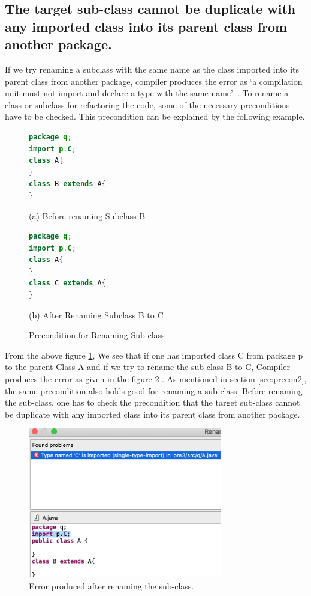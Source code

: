 \subsection{The target sub-class cannot be duplicate with any imported class into its parent class from another package.}

If we try renaming a subclass with the same name as the class imported into its parent class from another package, compiler produces the error as `a compilation unit must not import and declare a type with the same name'~\cite{EclipseWebPage}. 
To rename a class or subclass for refactoring the code, some of the necessary preconditions have to be checked. This precondition can be explained by the following example.

\begin{figure}[th]
\centering
\begin{minipage}[t]{0.45\linewidth}
\begin{lstlisting}[language=java, basicstyle=\scriptsize\ttfamily,frame=single]	
package q;
import p.C;
class A{	
}
class B extends A{	
}	
\end{lstlisting}
\tiny{(a) Before renaming Subclass B}
\end{minipage}
\hfill
\begin{minipage}[t]{0.45\linewidth}
\begin{lstlisting}[language=java, basicstyle=\scriptsize\ttfamily,frame=single]
package q;
import p.C;
class A{	
}
class C extends A{	
}	
\end{lstlisting}
\tiny{(b) After Renaming Subclass B to C}
\end{minipage}
\caption{Precondition for Renaming Sub-class}
\label{figure:fig7}
\end{figure}

From the above figure \ref{figure:fig7}, We see that if one has imported class C from  package  p to the parent Class A and if we try to rename the sub-class B to C, Compiler produces  the error as given in the figure \ref{figure:fig8} . As mentioned in  section \ref{sec:precon2}, the same precondition also holds good for renaming a sub-class. Before renaming the sub-class, one has to check the precondition that the  target sub-class cannot be duplicate with any imported class into its parent class from another package.

\begin{figure}[htbp]
\centerline{\includegraphics[width=85mm,scale=0.5]{precond3.png}}
\caption{Error produced after renaming the sub-class.}
\label{figure:fig8}
\end{figure}
